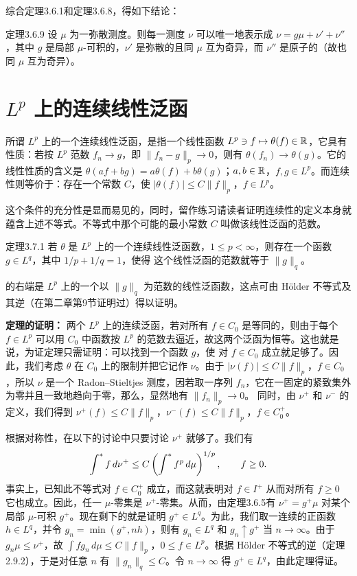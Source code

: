 综合定理3.6.1和定理3.6.8，得如下结论：
\begin{statement}{定理}{3.6.9}
设 $\mu$ 为一弥散测度。则每一测度 $\nu$ 可以唯一地表示成 $\nu=g\mu+\nu'+\nu''$，其中 $g$ 是局部 $\mu$-可积的，$\nu'$ 是弥散的且同 $\mu$ 互为奇异，而 $\nu''$ 是原子的（故也同 $\mu$ 互为奇异）。
\end{statement}
\section{\texorpdfstring{$L^p$}{Lp} 上的连续线性泛函}
所谓 $L^p$ 上的一个连续线性泛函，是指一个线性函数 $L^p\ni f\mapsto\theta(f)\in\mathbb R$，它具有性质：若按 $L^p$ 范数 $f_n\to g$，即 $\|f_n-g\|_p\to0$，则有 $\theta(f_n)\to\theta(g)$。它的线性性质的含义是 $\theta(af+bg)=a\theta(f)+b\theta(g)$；$a,b\in\mathbb R$，$f,g\in L^p$。而连续性则等价于：存在一个常数 $C$，使 $|\theta(f)|\le C\|f\|_p$，$f\in L^p$。

这个条件的充分性是显而易见的，同时，留作练习请读者证明连续性的定义本身就蕴含上述不等式。不等式中那个可能的最小常数 $C$ 叫做该线性泛函的范数。
\begin{statement}{定理}{3.7.1}
若 $\theta$ 是 $L^p$ 上的一个连续线性泛函数，$1\le p<\infty$，则存在一个函数 $g\in L^q$，其中 $1/p+1/q=1$，使得
这个线性泛函的范数就等于 $\|g\|_q$。
\end{statement}
 的右端是 $L^p$ 上的一个以 $\|g\|_q$ 为范数的线性泛函数，这点可由 Hölder 不等式及其逆（在第二章第9节证明过）得以证明。

\textbf{定理的证明：} 两个 $L^p$ 上的连续泛函，若对所有 $f\in C_0$ 是等同的，则由于每个 $f\in L^p$ 可以用 $C_0$ 中函数按 $L^p$ 的范数去逼近，故这两个泛函为恒等。这也就是说，为证定理只需证明：可以找到一个函数 $g$，使  对 $f\in C_0$ 成立就足够了。因此，我们考虑 $\theta$ 在 $C_0$ 上的限制并把它记作 $\nu$。由于 $|\nu(f)|\le C\|f\|_p$，$f\in C_0$，所以 $\nu$ 是一个 Radon--Stieltjes 测度，因若取一序列 $f_n$，它在一固定的紧致集外为零并且一致地趋向于零，那么，显然地有 $\|f_n\|_p\to0$。
同时，由 $\nu^+$ 和 $\nu^-$ 的定义，我们得到 $\nu^+(f)\le C\|f\|_p$，$\nu^-(f)\le C\|f\|_p$，$f\in C_0^+$。

根据对称性，在以下的讨论中只要讨论 $\nu^+$ 就够了。我们有
\[\int^{*} f\,d\nu^+\le C\left(\int^{*} f^p\,d\mu\right)^{1/p},\qquad f\ge0.\]
事实上，已知此不等式对 $f\in C_0^+$ 成立，而这就表明对 $f\in I^+$ 从而对所有 $f\ge0$ 它也成立。因此，任一 $\mu$-零集是 $\nu^+$-零集。从而，由定理3.6.5有 $\nu^+=g^+\mu$ 对某个局部 $\mu$-可积 $g^+$。现在剩下的就是证明 $g^+\in L^q$。为此，我们取一连续的正函数 $h\in L^q$，并令 $g_n=\min(g^+,nh)$，则有 $g_n\in L^q$ 和 $g_n\uparrow g^+$ 当 $n\to\infty$。由于 $g_n\mu\le\nu^+$，故 $\int fg_n\,d\mu\le C\|f\|_p$，$0\le f\in L^p$。根据 Hölder 不等式的逆（定理2.9.2），于是对任意 $n$ 有 $\|g_n\|_q\le C$。令 $n\to\infty$ 得 $g^+\in L^q$，由此定理得证。
